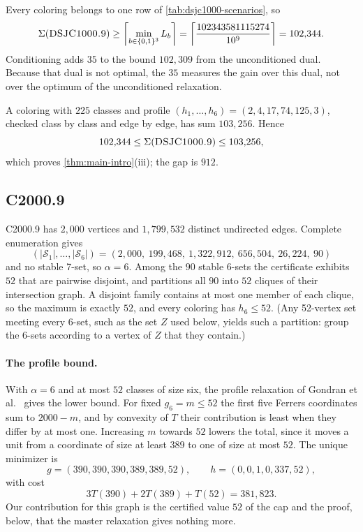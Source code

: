 \documentclass[11pt]{article}
\theoremstyle{definition}
\newcommand{\DSJCThousand}{\textnormal{\textsc{DSJC1000.9}}}
\newcommand{\CTwoThousand}{\textnormal{\textsc{C2000.9}}}
\newcommand{\Stable}{\mathcal{S}}
\begin{document}
Every coloring belongs to one row of \cref{tab:dsjc1000-scenarios}, so
\[
 \Sigma(\DSJCThousand)\ge
 \left\lceil\min_{b\in\{0,1\}^3}L_b\right\rceil
 =\left\lceil\frac{102343581115274}{10^9}\right\rceil
 =102{,}344.
\]
Conditioning adds $35$ to the bound $102{,}309$ from the unconditioned dual.
Because that dual is not optimal, the $35$ measures the gain over this dual,
not over the optimum of the unconditioned relaxation.

A coloring with $225$ classes and profile
$(h_1,\ldots,h_6)=(2,4,17,74,125,3)$, checked class by class and edge by
edge, has sum $103{,}256$. Hence
\begin{equation}
 102{,}344\le\Sigma(\DSJCThousand)\le103{,}256,
 \label{eq:dsjc1000-interval}
\end{equation}
which proves \cref{thm:main-intro}(iii); the gap is $912$.

\subsection{\CTwoThousand{}}
\label{sec:c2000}

\CTwoThousand{} has $2{,}000$ vertices and $1{,}799{,}532$ distinct undirected
edges. Complete enumeration gives
\[
 (|\Stable_1|,\ldots,|\Stable_6|)
 =(2{,}000,\ 199{,}468,\ 1{,}322{,}912,\ 656{,}504,\ 26{,}224,\ 90)
\]
and no stable 7-set, so $\alpha=6$. Among the $90$ stable 6-sets the
certificate exhibits $52$ that are pairwise disjoint, and partitions all $90$
into $52$ cliques of their intersection graph. A disjoint family contains at
most one member of each clique, so the maximum is exactly $52$, and every
coloring has $h_6\le52$. (Any 52-vertex set meeting every 6-set, such as the
set $Z$ used below, yields such a partition: group the 6-sets according to a
vertex of $Z$ that they contain.)

\paragraph{The profile bound.} With $\alpha=6$ and at most $52$ classes of
size six, the profile relaxation of Gondran et
al.~\cite[Sections~2.2--2.3]{gondran2019} gives the lower bound. For fixed
$g_6=m\le52$ the first five Ferrers coordinates sum to $2000-m$, and by
convexity of $T$ their contribution is least when they differ by at most one.
Increasing $m$ towards $52$ lowers the total, since it moves a unit from a
coordinate of size at least $389$ to one of size at most $52$. The unique
minimizer is
\[
  g=(390,390,390,389,389,52),\qquad h=(0,0,1,0,337,52),
\]
with cost
\[
  3T(390)+2T(389)+T(52)=381{,}823.
\]
Our contribution for this graph is the certified value $52$ of the cap and
the proof, below, that the master relaxation gives nothing more.
\end{document}
